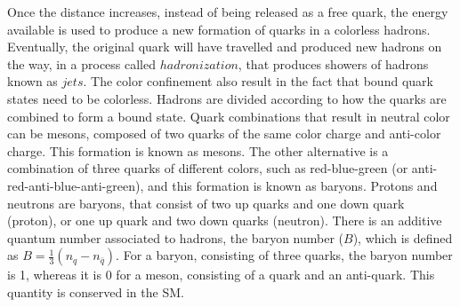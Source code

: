 Once the distance increases, instead of being released as a free quark, the energy available is used to produce a new formation of quarks in a colorless hadrons. 
Eventually, the original quark will have travelled and produced new hadrons on the way, in a process called $hadronization$, that produces showers of hadrons known as $jets$. 
The color confinement also result in the fact that bound quark states need to be colorless.
Hadrons are divided according to how the quarks are combined to form a bound state.  
Quark combinations that result in neutral color can be mesons, composed of two quarks of the same color charge and anti-color charge. This formation is known as mesons.  
The other alternative is a combination of three quarks of different colors, such as red-blue-green (or anti-red-anti-blue-anti-green), and this formation is known as baryons. 
Protons and neutrons are baryons, that consist of two up quarks and one down quark (proton), or one up quark and two down quarks (neutron). 
There is an additive quantum number associated to hadrons, the baryon number ($B$), which is defined as $B=\frac{1}{3}(n_{q}-n_{\bar{q}})$. 
For a baryon, consisting of three quarks, the baryon number is 1, whereas it is 0 for a meson, consisting of a quark and an anti-quark. This quantity is conserved in the SM.  

